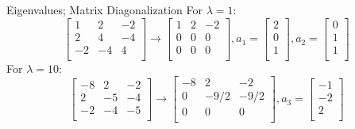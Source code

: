 \documentclass{beamer}
\begin{document}
\begin{frame}{Eigenvalues; Matrix Diagonalization}
    For $\lambda = 1$:
    \begin{equation*}
        \left[ \begin{matrix}
        1&		2&		-2\\
        2&		4&		-4\\
        -2&		-4&		4\\
    \end{matrix} \right] \rightarrow \left[ \begin{matrix}
        1&		2&		-2\\
        0&		0&		0\\
        0&		0&		0\\
    \end{matrix} \right] , a_1=\left[ \begin{array}{c}
        2\\
        0\\
        1\\
    \end{array} \right] , a_2=\left[ \begin{array}{c}
        0\\
        1\\
        1\\
    \end{array} \right]
    \end{equation*}
    For $\lambda = 10$:
    \begin{equation*}
        \left[ \begin{matrix}
        -8&		2&		-2\\
        2&		-5&		-4\\
        -2&		-4&		-5\\
    \end{matrix} \right] \rightarrow \left[ \begin{matrix}
        -8&		2&		-2\\
        0&		-9/2&		-9/2\\
        0&		0&		0\\
    \end{matrix} \right] , a_3=\left[ \begin{array}{c}
        -1\\
        -2\\
        2\\
    \end{array} \right]
    \end{equation*}
\end{frame}
\end{document}
